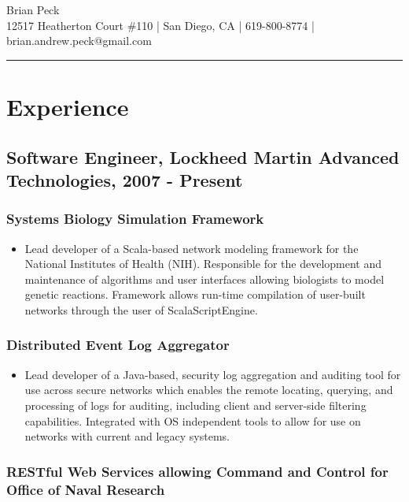 \documentclass[11pt]{article}
\title{}
\date{}
\begin{document}
\begin{center}
{\huge Brian Peck} \\
12517 Heatherton Court \#110 | San Diego, CA | 619-800-8774 | brian.andrew.peck@gmail.com
\hrule
\end{center}

\section*{Experience}
\label{sec-1}

\subsection*{Software Engineer, Lockheed Martin Advanced Technologies, 2007 - Present}
\label{sec-1.1}

\subsubsection*{Systems Biology Simulation Framework}
\label{sec-1.1.1}

\begin{itemize}
\item Lead developer of a Scala-based network modeling framework for the National Institutes of Health (NIH). Responsible for the development and maintenance of algorithms and user interfaces allowing biologists to model genetic reactions. Framework allows run-time compilation of user-built networks through the user of ScalaScriptEngine.
\end{itemize}
\subsubsection*{Distributed Event Log Aggregator}
\label{sec-1.1.2}

\begin{itemize}
\item Lead developer of a Java-based, security log aggregation and auditing tool for use across secure networks which enables the remote locating, querying, and processing of logs for auditing, including client and server-side filtering capabilities. Integrated with OS independent tools to allow for use on networks with current and legacy systems.
\end{itemize}
\subsubsection*{RESTful Web Services allowing Command and Control for Office of Naval Research}
\label{sec-1.1.3}
\end{document}
